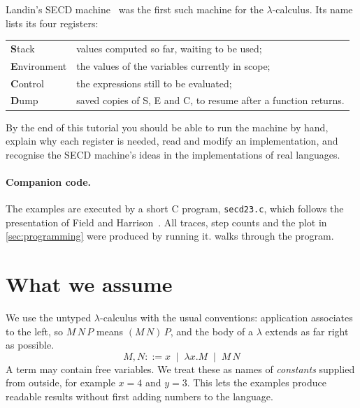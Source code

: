 \documentclass[11pt,a4paper]{article}
\theoremstyle{definition}
\theoremstyle{plain}
\begin{document}
Landin's SECD machine~\cite{landin64} was the first such machine for the
$\lambda$-calculus. Its name lists its four registers:
\begin{center}
\begin{tabular}{@{}ll@{}}
\textbf{S}tack & values computed so far, waiting to be used;\\
\textbf{E}nvironment & the values of the variables currently in scope;\\
\textbf{C}ontrol & the expressions still to be evaluated;\\
\textbf{D}ump & saved copies of S, E and C, to resume after a function returns.
\end{tabular}
\end{center}
By the end of this tutorial you should be able to run the machine by hand,
explain why each register is needed, read and modify an implementation, and
recognise the SECD machine's ideas in the implementations of real languages.

\paragraph{Companion code.}
The examples are executed by a short C program, \texttt{secd23.c}, which
follows the presentation of Field and Harrison~\cite{fieldharrison}. All
traces, step counts and the plot in \cref{sec:programming} were produced by
running it.  walks through the program.

\section{What we assume}\label{sec:background}

We use the untyped $\lambda$-calculus with the usual conventions: application
associates to the left, so $M\,N\,P$ means $(M\,N)\,P$, and the body of a
$\lambda$ extends as far right as possible.
\[
  M, N ::= x \;\mid\; \lambda x.M \;\mid\; M\,N
\]
A term may contain free variables. We treat these as names of
\emph{constants} supplied from outside, for example $x = 4$ and $y = 3$. This
lets the examples produce readable results without first adding numbers
to the language.
\end{document}

